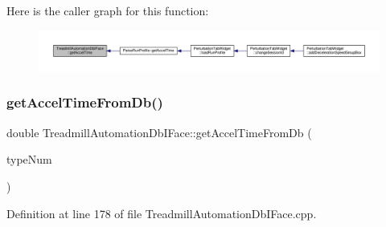 Here is the caller graph for this function\+:
\nopagebreak
\begin{figure}[H]
\begin{center}
\leavevmode
\includegraphics[width=350pt]{class_treadmill_automation_db_i_face_a69909558cb3eb14730a8bee5b1fe4a9f_icgraph}
\end{center}
\end{figure}
\mbox{\label{class_treadmill_automation_db_i_face_a0872715321e189d3a3fbf1084e3d5274}} 
\subsubsection{\texorpdfstring{get\+Accel\+Time\+From\+Db()}{getAccelTimeFromDb()}}
{\footnotesize\ttfamily double Treadmill\+Automation\+Db\+I\+Face\+::get\+Accel\+Time\+From\+Db (\begin{DoxyParamCaption}\item[{Q\+String}]{type\+Num }\end{DoxyParamCaption})}



Definition at line 178 of file Treadmill\+Automation\+Db\+I\+Face.\+cpp.

